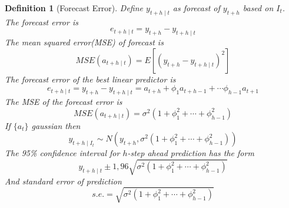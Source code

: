\documentclass[11pt]{article}
\newtheorem{definition}{Definition}[section]
\theoremstyle{definition}
\begin{document}
\begin{definition}[Forecast Error]
\normalfont Define $y_{t+h\mid t}$ as forecast of $y_{t+h}$ based on $I_t$. The forecast error is
\[
e_{t+h\mid t} = y_{t+h}-y_{t+h\mid t}
\]
The mean squared error(MSE) of forecast is
\[
MSE(a_{t+h\mid t}) = E[(y_{t+h}-y_{t+h\mid t})^2]
\]
The forecast error of the best linear predictor is
\[
e_{t+h\mid t} = y_{t+h}-y_{t+h\mid t} = a_{t+h} + \phi_1 a_{t+h-1} + \cdots \phi_{h-1}a_{t+1}
\]
The MSE of the forecast error is
\[
MSE(a_{t+h\mid t}) = \sigma^2 (1 + \phi_1^2 + \cdots + \phi_{h-1}^2)
\]
If $\{a_t\}$ gaussian then
\[
y_{t+h\mid I_t}\sim N(y_{t+h}, \sigma^2 ( 1+ \phi_1^2 + \cdots + \phi_{h-1}^2))
\]
The 95\% confidence interval for $h$-step ahead prediction has the form 
\[
y_{t+h\mid t} \pm 1,96 \sqrt{\sigma^2 (1 + \phi_1^2 + \cdots + \phi_{h-1}^2)}
\]
And standard error of prediction
\[
s.e. = \sqrt{\sigma^2 (1 + \phi_1^2 + \cdots + \phi_{h-1}^2)}
\]
\end{definition}
\end{document}

